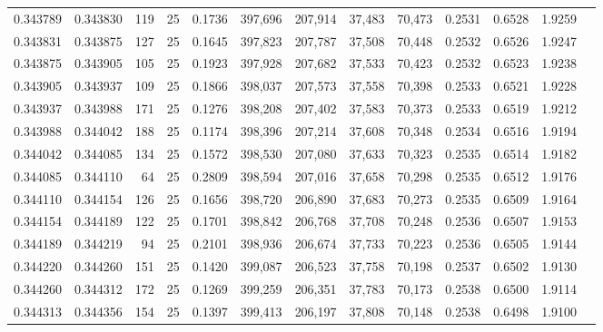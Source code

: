 \begin{tabular}{rrrrrrrrrrrrr}
0.343789 & 0.343830 &   119 &  25 &                                     0.1736 & 397,696 & 207,914 &  37,483 &  70,473 & 0.2531 & 0.6528 & 1.9259 \\
0.343831 & 0.343875 &   127 &  25 &                                     0.1645 & 397,823 & 207,787 &  37,508 &  70,448 & 0.2532 & 0.6526 & 1.9247 \\
0.343875 & 0.343905 &   105 &  25 &                                     0.1923 & 397,928 & 207,682 &  37,533 &  70,423 & 0.2532 & 0.6523 & 1.9238 \\
0.343905 & 0.343937 &   109 &  25 &                                     0.1866 & 398,037 & 207,573 &  37,558 &  70,398 & 0.2533 & 0.6521 & 1.9228 \\
0.343937 & 0.343988 &   171 &  25 &                                     0.1276 & 398,208 & 207,402 &  37,583 &  70,373 & 0.2533 & 0.6519 & 1.9212 \\
0.343988 & 0.344042 &   188 &  25 &                                     0.1174 & 398,396 & 207,214 &  37,608 &  70,348 & 0.2534 & 0.6516 & 1.9194 \\
0.344042 & 0.344085 &   134 &  25 &                                     0.1572 & 398,530 & 207,080 &  37,633 &  70,323 & 0.2535 & 0.6514 & 1.9182 \\
0.344085 & 0.344110 &    64 &  25 &                                     0.2809 & 398,594 & 207,016 &  37,658 &  70,298 & 0.2535 & 0.6512 & 1.9176 \\
0.344110 & 0.344154 &   126 &  25 &                                     0.1656 & 398,720 & 206,890 &  37,683 &  70,273 & 0.2535 & 0.6509 & 1.9164 \\
0.344154 & 0.344189 &   122 &  25 &                                     0.1701 & 398,842 & 206,768 &  37,708 &  70,248 & 0.2536 & 0.6507 & 1.9153 \\
0.344189 & 0.344219 &    94 &  25 &                                     0.2101 & 398,936 & 206,674 &  37,733 &  70,223 & 0.2536 & 0.6505 & 1.9144 \\
0.344220 & 0.344260 &   151 &  25 &                                     0.1420 & 399,087 & 206,523 &  37,758 &  70,198 & 0.2537 & 0.6502 & 1.9130 \\
0.344260 & 0.344312 &   172 &  25 &                                     0.1269 & 399,259 & 206,351 &  37,783 &  70,173 & 0.2538 & 0.6500 & 1.9114 \\
0.344313 & 0.344356 &   154 &  25 &                                     0.1397 & 399,413 & 206,197 &  37,808 &  70,148 & 0.2538 & 0.6498 & 1.9100 \\

\end{tabular}

